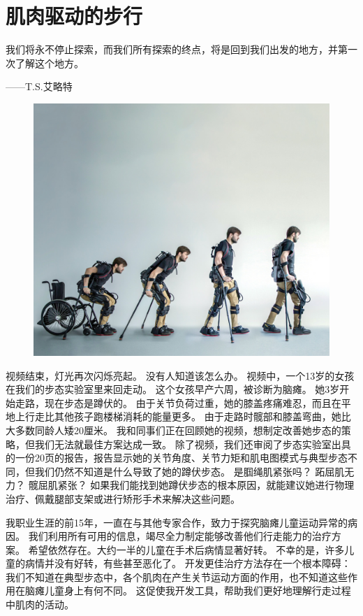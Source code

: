 \chapter{肌肉驱动的步行} \label{chap:chap11}

我们将永不停止探索，而我们所有探索的终点，将是回到我们出发的地方，并第一次了解这个地方。
\begin{flushright}
	——T.S.艾略特
\end{flushright}


\begin{figure}[!htb]
	\centering
	\includegraphics[width=1.0\linewidth]{chap11/11_0}
	\caption*{ \label{fig:11_0}}
\end{figure}


视频结束，灯光再次闪烁亮起。
没有人知道该怎么办。
视频中，一个13岁的女孩在我们的步态实验室里来回走动。
这个女孩早产六周，被诊断为脑瘫。
她3岁开始走路，现在步态是蹲伏的。
由于关节负荷过重，她的膝盖疼痛难忍，而且在平地上行走比其他孩子跑楼梯消耗的能量更多。
由于走路时髋部和膝盖弯曲，她比大多数同龄人矮20厘米。
我和同事们正在回顾她的视频，想制定改善她步态的策略，但我们无法就最佳方案达成一致。
除了视频，我们还审阅了步态实验室出具的一份20页的报告，报告显示她的关节角度、关节力矩​​和肌电图模式与典型步态不同，但我们仍然不知道是什么导致了她的蹲伏步态。
是腘绳肌紧张吗？
跖屈肌无力？
髋屈肌紧张？
如果我们能找到她蹲伏步态的根本原因，就能建议她进行物理治疗、佩戴腿部支架或进行矫形手术来解决这些问题。


我职业生涯的前15年，一直在与其他专家合作，致力于探究脑瘫儿童运动异常的病因。
我们利用所有可用的信息，竭尽全力制定能够改善他们行走能力的治疗方案。
希望依然存在。大约一半的儿童在手术后病情显著好转。
不幸的是，许多儿童的病情并没有好转，有些甚至恶化了。
开发更佳治疗方法存在一个根本障碍：我们不知道在典型步态中，各个肌肉在产生关节运动方面的作用，也不知道这些作用在脑瘫儿童身上有何不同。
这促使我开发工具，帮助我们更好地理解行走过程中肌肉的活动。


